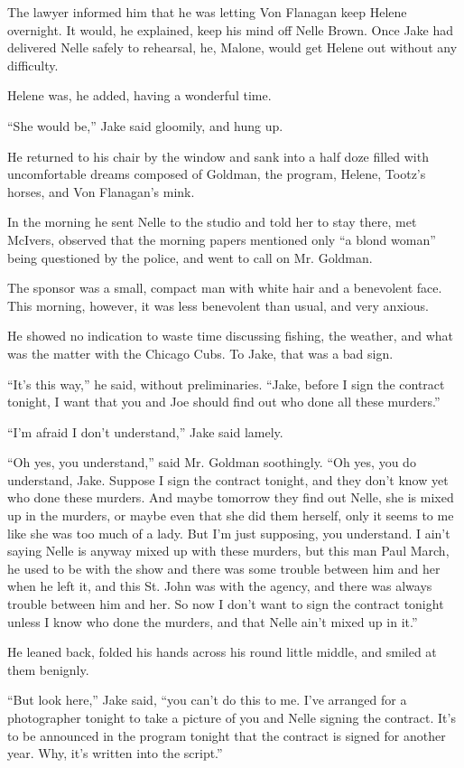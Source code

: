 \documentclass{novel}
\begin{document}
The lawyer informed him that he was letting Von Flanagan keep Helene overnight. It would, he explained, keep his mind off Nelle Brown. Once Jake had delivered Nelle safely to rehearsal, he, Malone, would get Helene out without any difficulty.

Helene was, he added, having a wonderful time.

“She would be,” Jake said gloomily, and hung up.

He returned to his chair by the window and sank into a half doze filled with uncomfortable dreams composed of Goldman, the program, Helene, Tootz’s horses, and Von Flanagan’s mink.

In the morning he sent Nelle to the studio and told her to stay there, met McIvers, observed that the morning papers mentioned only “a blond woman” being questioned by the police, and went to call on Mr. Goldman.

The sponsor was a small, compact man with white hair and a benevolent face. This morning, however, it was less benevolent than usual, and very anxious.

He showed no indication to waste time discussing fishing, the weather, and what was the matter with the Chicago Cubs. To Jake, that was a bad sign.

“It’s this way,” he said, without preliminaries. “Jake, before I sign the contract tonight, I want that you and Joe should find out who done all these murders.”

“I’m afraid I don’t understand,” Jake said lamely.

“Oh yes, you understand,” said Mr. Goldman soothingly. “Oh yes, you do understand, Jake. Suppose I sign the contract tonight, and they don’t know yet who done these murders. And maybe tomorrow they find out Nelle, she is mixed up in the murders, or maybe even that she did them herself, only it seems to me like she was too much of a lady. But I’m just supposing, you understand. I ain’t saying Nelle is anyway mixed up with these murders, but this man Paul March, he used to be with the show and there was some trouble between him and her when he left it, and this St. John was with the agency, and there was always trouble between him and her. So now I don’t want to sign the contract tonight unless I know who done the murders, and that Nelle ain’t mixed up in it.”

He leaned back, folded his hands across his round little middle, and smiled at them benignly.

“But look here,” Jake said, “you can’t do this to me. I’ve arranged for a photographer tonight to take a picture of you and Nelle signing the contract. It’s to be announced in the program tonight that the contract is signed for another year. Why, it’s written into the script.”
\end{document}
